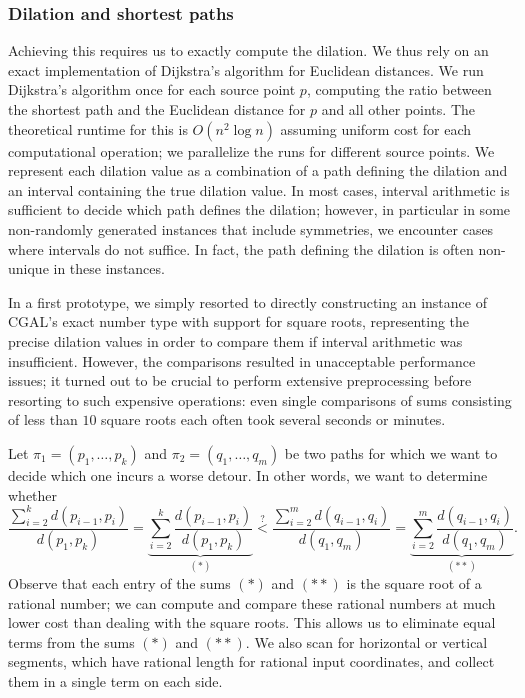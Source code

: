 \subsubsection{Dilation and shortest paths}
Achieving this requires us to exactly compute the dilation.
We thus rely on an exact implementation of Dijkstra's algorithm for Euclidean distances.
We run Dijkstra's algorithm once for each source point $p$, computing the ratio between the shortest path and the Euclidean distance for $p$ and all other points.
The theoretical runtime for this is $O(n^2\log n)$ assuming uniform cost for each computational operation; we parallelize the runs for different source points.
We represent each dilation value as a combination of a path defining the dilation and an interval containing the true dilation value.
In most cases, interval arithmetic is sufficient to decide which path defines the dilation;
however, in particular in some non-randomly generated instances that include symmetries, we encounter cases where intervals do not suffice.
In fact, the path defining the dilation is often non-unique in these instances.

In a first prototype, we simply resorted to directly constructing an instance of CGAL's exact number type with support for square roots, representing the precise dilation values in order to compare them if interval arithmetic was insufficient.
However, the comparisons resulted in unacceptable performance issues; it turned out to be crucial to perform extensive preprocessing before resorting to such expensive operations:
even single comparisons of sums consisting of less than $10$ square roots each often took several seconds or minutes.

Let $\pi_1 = (p_1, \ldots, p_k)$ and $\pi_2 = (q_1, \ldots, q_m)$ be two paths for which we want to decide which one incurs a worse detour.
In other words, we want to determine whether
\[\frac{\sum\limits_{i = 2}^k d(p_{i-1}, p_i)}{d(p_1, p_k)} = \underbrace{\sum\limits_{i = 2}^k \frac{d(p_{i-1}, p_i)}{d(p_1, p_k)}}_{(*)} \overset{?}{<} \frac{\sum\limits_{i = 2}^m d(q_{i-1}, q_i)}{d(q_1, q_m)} = \underbrace{\sum\limits_{i = 2}^m \frac{d(q_{i-1}, q_i)}{d(q_1, q_m)}}_{(**)}.\]
Observe that each entry of the sums $(*)$ and $(**)$ is the square root of a rational number;
we can compute and compare these rational numbers at much lower cost than dealing with the square roots.
This allows us to eliminate equal terms from the sums $(*)$ and $(**)$.
We also scan for horizontal or vertical segments, which have rational length for rational input coordinates,
and collect them in a single term on each side.

